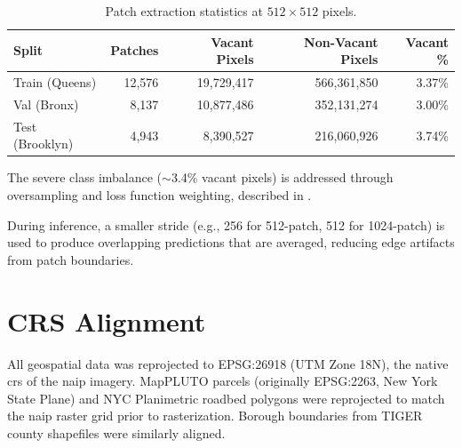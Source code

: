 \begin{table}[htbp]
  \centering
  \caption{Patch extraction statistics at $512\times512$ pixels.}
  \label{tab:patch_stats}
  \begin{tabular}{lrrrr}
    \toprule
    \textbf{Split} & \textbf{Patches} & \textbf{Vacant Pixels} & \textbf{Non-Vacant Pixels} & \textbf{Vacant \%} \\
    \midrule
    Train (Queens)    & 12,576 & 19,729,417 & 566,361,850  & 3.37\% \\
    Val (Bronx)       &  8,137 & 10,877,486 & 352,131,274  & 3.00\% \\
    Test (Brooklyn)   &  4,943 &  8,390,527 & 216,060,926  & 3.74\% \\
    \bottomrule
  \end{tabular}
\end{table}

The severe class imbalance ($\sim$3.4\% vacant pixels) is addressed through oversampling and loss function weighting, described in .

During inference, a smaller stride (e.g., 256 for 512-patch, 512 for 1024-patch) is used to produce overlapping predictions that are averaged, reducing edge artifacts from patch boundaries.

\section{CRS Alignment}
\label{sec:crs}

All geospatial data was reprojected to EPSG:26918 (UTM Zone 18N), the native \acrshort{crs} of the \acrshort{naip} imagery. MapPLUTO parcels (originally EPSG:2263, New York State Plane) and NYC Planimetric roadbed polygons were reprojected to match the \acrshort{naip} raster grid prior to rasterization. Borough boundaries from TIGER county shapefiles were similarly aligned.
